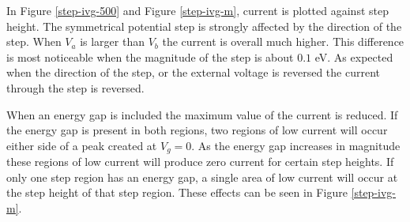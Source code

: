 			In Figure \ref{step-ivg-500} and Figure \ref{step-ivg-m}, current is plotted against step height. The symmetrical potential step is strongly affected by the direction of the step. When $V_{a}$ is larger than $V_{b}$ the current is overall much higher. This difference is most noticeable when the magnitude of the step is about $0.1$ eV. As expected when the direction of the step, or the external voltage is reversed the current through the step is reversed.

			When an energy gap is included the maximum value of the current is reduced. If the energy gap is present in both regions, two regions of low current will occur either side of a peak created at $V_{g}=0$. As the energy gap increases in magnitude these regions of low current will produce zero current for certain step heights. If only one step region has an energy gap, a single area of low current will occur at the step height of that step region. These effects can be seen in Figure \ref{step-ivg-m}.
